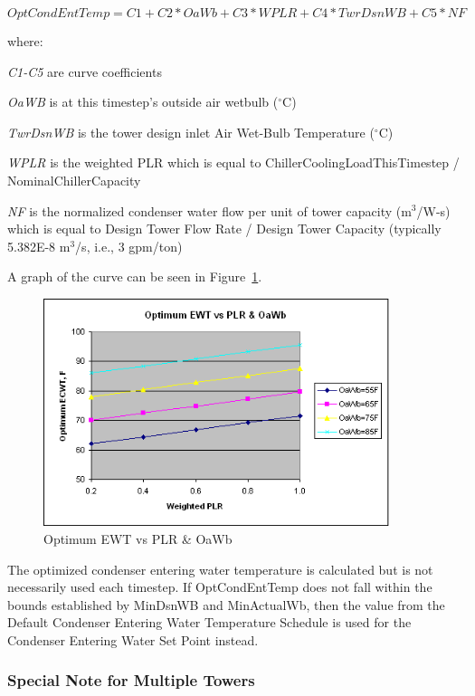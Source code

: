 \begin{equation}
OptCondEntTemp = C1 + C2*OaWb + C3*WPLR + C4*TwrDsnWB + C5*NF
\end{equation}

where:

\emph{C1-C5} are curve coefficients

\emph{OaWB} is at this timestep's outside air wetbulb (\(^{\circ}\)C)

\emph{TwrDsnWB} is the tower design inlet Air Wet-Bulb Temperature (\(^{\circ}\)C)

\emph{WPLR} is the weighted PLR which is equal to ChillerCoolingLoadThisTimestep / NominalChillerCapacity

\emph{NF} is the normalized condenser water flow per unit of tower capacity (m\(^3\)/W-s) which is equal to Design Tower Flow Rate / Design Tower Capacity (typically 5.382E-8 m\(^3\)/s, i.e., 3 gpm/ton)

A graph of the curve can be seen in Figure~\ref{fig:optimum-ewt-vs-plr-oawb}.

\begin{figure}[hbtp] %
\centering
\includegraphics[width=0.9\textwidth, height=0.9\textheight, keepaspectratio=true]{media/image6484.png}
\caption{Optimum EWT vs PLR \& OaWb \protect \label{fig:optimum-ewt-vs-plr-oawb}}
\end{figure}

The optimized condenser entering water temperature is calculated but is not necessarily used each timestep. If OptCondEntTemp does not fall within the bounds established by MinDsnWB and MinActualWb, then the value from the Default Condenser Entering Water Temperature Schedule is used for the Condenser Entering Water Set Point instead.

\subsubsection{Special Note for Multiple Towers}\label{special-note-for-multiple-towers}

